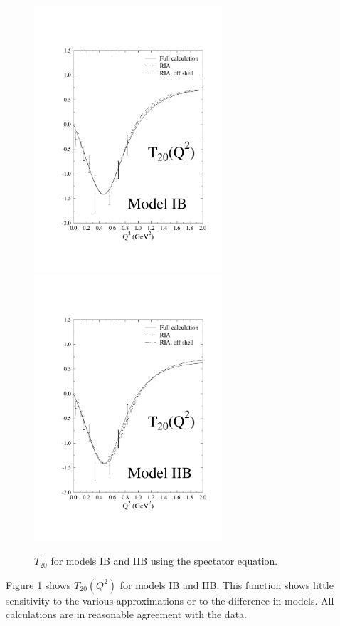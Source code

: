 \documentclass[mythesis.tex]{subfiles}
\begin{document}
\begin{figure}
     \centerline{\includegraphics[width=2.75in]{graphics/t20_ib.pdf}
     \includegraphics[width=2.75in]{graphics/t20_iib.pdf}}
   \caption{$T_{20}$ for models IB and IIB using the
           spectator equation.}\label{T20}
\end{figure}

Figure \ref{T20} shows $T_{20}(Q^2)$ for models IB and IIB. This function
shows little sensitivity to the various approximations or to the difference
in models. All calculations are in reasonable agreement with the data.
\end{document}
